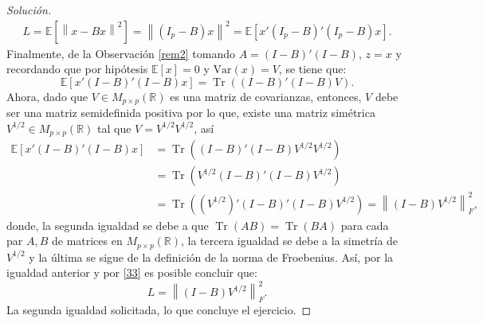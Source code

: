 \documentclass[10.5pt,notitlepage]{article}
\newenvironment{solucion}
  {\begin{proof}[Solución]}
  {\end{proof}}
\DeclareMathOperator{\Tr}{Tr}
\newcommand{\RR}{\mathbb{R}}
\newcommand{\EE}{\mathbb{E}}
\newcommand{\Var}{\mathrm{Var}}
\newcommand{\norm}[1]{\left\| #1 \right\|}
\theoremstyle{plain}
\begin{document}
\begin{solucion}
\begin{align}
 L = \EE[\norm{ x - Bx }^2] = \norm{ (I_{p} - B)x }^2 = \EE[x'(I_{p} - B)'(I_{p}- B)x].   
\end{align}
Finalmente, de la Observación \ref{rem2} tomando \(A =(I - B)'(I - B)\), \(z = x\) y recordando que por hipótesis \(\EE[x] = 0\) y \(\Var(x) = V\), se tiene que: 
\[
\EE[x'(I - B)'(I- B)x] = \Tr((I - B)'(I - B)V).  
\] 
Ahora, dado que \(V\in M_{p \times p}(\RR)\) es una matriz de covarianzas, entonces, \(V\) debe ser una matriz semidefinida positiva por lo que, existe una matriz simétrica \(V^{1/2}\in M_{p \times p}(\RR)\) tal que \(V = V^{1/2}V^{1/2}\), así 
\begin{align*}
  \EE[x'(I - B)'(I- B)x] &= \Tr((I - B)'(I - B)V^{1/2}V^{1/2}) \\ 
                       &= \Tr(V^{1/2}(I - B)'(I - B)V^{1/2}) \\ 
                       &= \Tr((V^{1/2})'(I - B)'(I - B)V^{1/2}) = \norm{(I - B)V^{1/2}}_{F}^{2},   
\end{align*}
donde, la segunda igualdad se debe a que \(\Tr(AB) = \Tr(BA)\) para cada par \(A,B\) de matrices en \(M_{p\times p}(\RR)\), la tercera igualdad se debe a la simetría de \(V^{1/2}\) y la última se sigue de la definición de la norma de Froebenius. Así, por la igualdad anterior y por \eqref{33} es posible concluir que:
\[
 L = \norm{(I - B)V^{1/2}}_{F}^{2}.
\]
La segunda igualdad solicitada, lo que concluye el ejercicio. 





\end{solucion}
\end{document}
